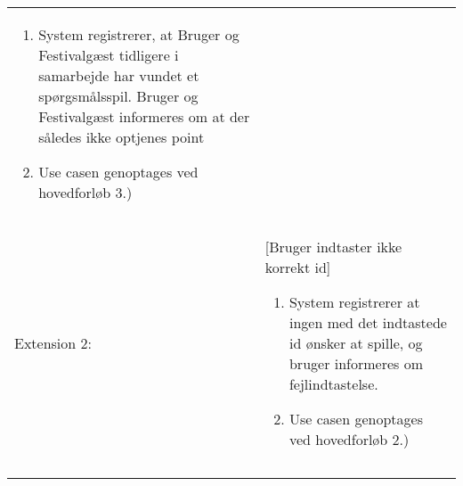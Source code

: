 \begin{tabular}{ >{\raggedleft} p{3cm} | p{12cm} }
\begin{enumerate}[label=\arabic*.),itemjoin={\newline},topsep=0pt,partopsep=0pt,itemsep=0pt,leftmargin=*]
\item System registrerer, at Bruger og Festivalgæst tidligere i samarbejde har vundet et spørgsmålsspil. Bruger og Festivalgæst informeres om at der således ikke optjenes point
\item Use casen genoptages ved hovedforløb 3.)
\end{enumerate} \\
Extension 2: & [Bruger indtaster ikke korrekt id]
\vspace{2 mm}
\begin{enumerate}[label=\arabic*.),itemjoin={\newline},topsep=0pt,partopsep=0pt,itemsep=0pt,leftmargin=*]   
\item System registrerer at ingen med det indtastede id ønsker at spille, og bruger informeres om fejlindtastelse.
\item Use casen genoptages ved hovedforløb 2.)
\end{enumerate} \\
& \\
& \\
\end{tabular}

\newpage

